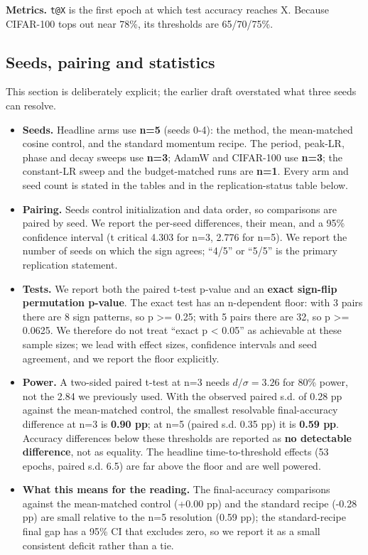 \documentclass[11pt,a4paper]{article}
\begin{document}
\textbf{Metrics.} \texttt{t@X} is the first epoch at which test accuracy reaches X. Because CIFAR-100 tops out near 78\%, its thresholds are 65/70/75\%.

\subsection{Seeds, pairing and statistics}
This section is deliberately explicit; the earlier draft overstated what three seeds can resolve.

\begin{itemize}
\item \textbf{Seeds.} Headline arms use \textbf{n=5} (seeds 0-4): the method, the mean-matched cosine control, and the standard momentum recipe. The period, peak-LR, phase and decay sweeps use \textbf{n=3}; AdamW and CIFAR-100 use \textbf{n=3}; the constant-LR sweep and the budget-matched runs are \textbf{n=1}. Every arm and seed count is stated in the tables and in the replication-status table below.
\item \textbf{Pairing.} Seeds control initialization and data order, so comparisons are paired by seed. We report the per-seed differences, their mean, and a 95\% confidence interval (t critical 4.303 for n=3, 2.776 for n=5). We report the number of seeds on which the sign agrees; ``4/5'' or ``5/5'' is the primary replication statement.
\item \textbf{Tests.} We report both the paired t-test p-value and an \textbf{exact sign-flip permutation p-value}. The exact test has an n-dependent floor: with 3 pairs there are 8 sign patterns, so p >= 0.25; with 5 pairs there are 32, so p >= 0.0625. We therefore do not treat ``exact p < 0.05'' as achievable at these sample sizes; we lead with effect sizes, confidence intervals and seed agreement, and we report the floor explicitly.
\item \textbf{Power.} A two-sided paired t-test at n=3 needs $d/\sigma = 3.26$ for 80\% power, not the 2.84 we previously used. With the observed paired s.d. of 0.28 pp against the mean-matched control, the smallest resolvable final-accuracy difference at n=3 is \textbf{0.90 pp}; at n=5 (paired s.d. 0.35 pp) it is \textbf{0.59 pp}. Accuracy differences below these thresholds are reported as \textbf{no detectable difference}, not as equality. The headline time-to-threshold effects (53 epochs, paired s.d. 6.5) are far above the floor and are well powered.
\item \textbf{What this means for the reading.} The final-accuracy comparisons against the mean-matched control (+0.00 pp) and the standard recipe (-0.28 pp) are small relative to the n=5 resolution (0.59 pp); the standard-recipe final gap has a 95\% CI that excludes zero, so we report it as a small consistent deficit rather than a tie.
\end{itemize}
\end{document}
